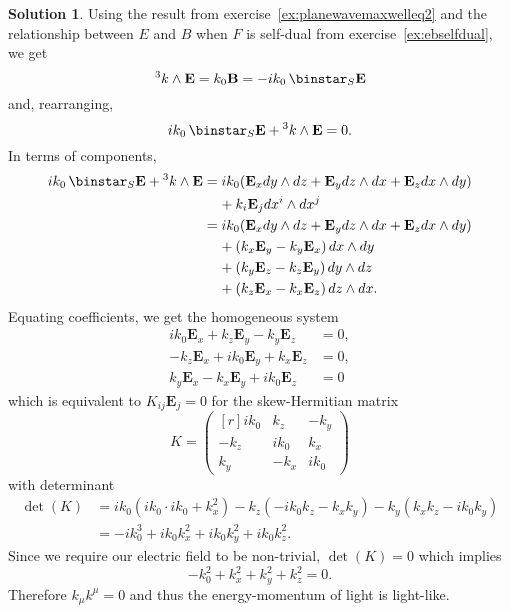 \documentclass[11pt, a4paper]{report}
\theoremstyle{definition}
\newtheorem{solution}{Solution}[part]
\newenvironment{sol}{\begin{solution}}{\end{solution}\pagebreak[3]}
\newcommand*{\pheq}{\ensuremath\mathrel{\phantom{=}}\negmedspace{}}
\renewcommand*{\d}{\ensuremath\mathop{}\mathopen{}d}
\renewcommand*{\star}{\ensuremath\mathop{}\mathopen\binstar\mathord{}}
\begin{document}
\begin{sol}


Using the result from exercise~\ref{ex:planewavemaxwelleq2} and the relationship between $E$ and $B$ when $F$ is self-dual from exercise~\ref{ex:ebselfdual}, we get
\[
    ^3 k \wedge \mathbf{E} = k_0 \mathbf{B} = -ik_0 \star_S \mathbf{E}
\]
and, rearranging,
\[
    ik_0 \star_S \mathbf{E} + {}^3 k \wedge \mathbf{E} = 0.
\]
In terms of components,
\begin{align*}
    ik_0 \star_S \mathbf{E} + {}^3 k \wedge \mathbf{E}
        &= ik_0 (\mathbf{E}_x dy \wedge dz
                 + \mathbf{E}_y dz \wedge dx
                 + \mathbf{E}_z dx \wedge dy) \\
        &\pheq + k_i \mathbf{E}_j dx^i \wedge dx^j \\
        &= ik_0 (\mathbf{E}_x dy \wedge dz
                 + \mathbf{E}_y dz \wedge dx
                 + \mathbf{E}_z dx \wedge dy) \\
        &\pheq + (k_x \mathbf{E}_y - k_y \mathbf{E}_x) \d x \wedge dy \\
        &\pheq + (k_y \mathbf{E}_z - k_z \mathbf{E}_y) \d y \wedge dz \\
        &\pheq + (k_z \mathbf{E}_x - k_x \mathbf{E}_z) \d z \wedge dx.
\end{align*}
Equating coefficients, we get the homogeneous system
\begin{align*}
    ik_0 \mathbf{E}_x + k_z \mathbf{E}_y - k_y \mathbf{E}_z &= 0, \\
    -k_z \mathbf{E}_x + ik_0 \mathbf{E}_y + k_x \mathbf{E}_z &= 0, \\
    k_y \mathbf{E}_x - k_x \mathbf{E}_y + ik_0 \mathbf{E}_z &= 0
\end{align*}
which is equivalent to $K_{ij} \mathbf{E}_j = 0$ for the skew-Hermitian matrix
\[
    K = \begin{pmatrix*}[r]
            ik_0 & k_z & -k_y \\
            -k_z & ik_0 & k_x \\
            k_y & -k_x & ik_0
        \end{pmatrix*}
\]
with determinant
\begin{align*}
    \det(K) &= ik_0 (ik_0 \cdot ik_0 + k_x^2) - k_z(-ik_0 k_z - k_x k_y) - k_y (k_x k_z - ik_0 k_y) \\
            &= -i k_0^3 + ik_0 k_x^2 + ik_0 k_y^2 + ik_0 k_z^2.
\end{align*}
Since we require our electric field to be non-trivial, $\det(K) = 0$ which implies
\[
    -k_0^2 + k_x^2 + k_y^2 + k_z^2 = 0.
\]
Therefore $k_\mu k^\mu = 0$ and thus the energy-momentum of light is light-like.

\end{sol}
\end{document}
